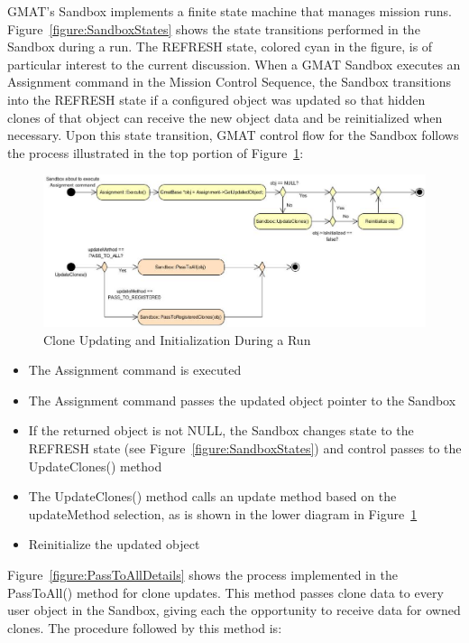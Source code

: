 \documentclass[10pt,letterpaper]{article}
\begin{document}
GMAT's Sandbox implements a finite state machine that manages mission runs.  Figure~\ref{figure:SandboxStates} shows the state transitions performed in the Sandbox during a run.  The REFRESH state, colored cyan in the figure, is of particular interest to the current discussion.  When a GMAT Sandbox executes an Assignment command in the Mission Control Sequence, the Sandbox transitions into the REFRESH state if a configured object was updated so that hidden clones of that object can receive the new object data and be reinitialized when necessary.  Upon this state transition, GMAT control flow for the Sandbox follows the process illustrated in the top portion of Figure~\ref{figure:SandboxReinitialization}:

\begin{figure}[htb]
\begin{center}
\includegraphics[scale=0.5]{Images/SandboxCloneUpdates.eps}
\caption{\label{figure:SandboxReinitialization}Clone Updating and Initialization During a Run}
\end{center}
\end{figure}

\begin{itemize}
\item The Assignment command is executed
\item The Assignment command passes the updated object pointer to the Sandbox
\item If the returned object is not NULL, the Sandbox changes state to the REFRESH state (see Figure~\ref{figure:SandboxStates}) and control passes to the UpdateClones() method
\item The UpdateClones() method calls an update method based on the updateMethod selection, as is shown in the lower diagram in Figure~\ref{figure:SandboxReinitialization} 
\item Reinitialize the updated object
\end{itemize}

Figure~\ref{figure:PassToAllDetails} shows the process implemented in the PassToAll() method for clone updates.  This method passes clone data to every user object in the Sandbox, giving each the opportunity to receive data for owned clones.  The procedure followed by this method is:
\end{document}
